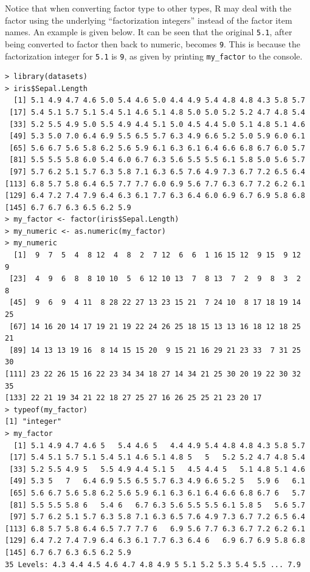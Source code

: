 Notice that when converting factor type to other types, R may deal with the factor using the underlying ``factorization integers'' instead of the factor item names. An example is given below. It can be seen that the original \verb|5.1|, after being converted to factor then back to numeric, becomes \verb|9|. This is because the factorization integer for \verb|5.1| is \verb|9|, as given by printing \verb|my_factor| to the console.
\begin{lstlisting}
> library(datasets)
> iris$Sepal.Length
  [1] 5.1 4.9 4.7 4.6 5.0 5.4 4.6 5.0 4.4 4.9 5.4 4.8 4.8 4.3 5.8 5.7
 [17] 5.4 5.1 5.7 5.1 5.4 5.1 4.6 5.1 4.8 5.0 5.0 5.2 5.2 4.7 4.8 5.4
 [33] 5.2 5.5 4.9 5.0 5.5 4.9 4.4 5.1 5.0 4.5 4.4 5.0 5.1 4.8 5.1 4.6
 [49] 5.3 5.0 7.0 6.4 6.9 5.5 6.5 5.7 6.3 4.9 6.6 5.2 5.0 5.9 6.0 6.1
 [65] 5.6 6.7 5.6 5.8 6.2 5.6 5.9 6.1 6.3 6.1 6.4 6.6 6.8 6.7 6.0 5.7
 [81] 5.5 5.5 5.8 6.0 5.4 6.0 6.7 6.3 5.6 5.5 5.5 6.1 5.8 5.0 5.6 5.7
 [97] 5.7 6.2 5.1 5.7 6.3 5.8 7.1 6.3 6.5 7.6 4.9 7.3 6.7 7.2 6.5 6.4
[113] 6.8 5.7 5.8 6.4 6.5 7.7 7.7 6.0 6.9 5.6 7.7 6.3 6.7 7.2 6.2 6.1
[129] 6.4 7.2 7.4 7.9 6.4 6.3 6.1 7.7 6.3 6.4 6.0 6.9 6.7 6.9 5.8 6.8
[145] 6.7 6.7 6.3 6.5 6.2 5.9
> my_factor <- factor(iris$Sepal.Length)
> my_numeric <- as.numeric(my_factor)
> my_numeric
  [1]  9  7  5  4  8 12  4  8  2  7 12  6  6  1 16 15 12  9 15  9 12  9
 [23]  4  9  6  8  8 10 10  5  6 12 10 13  7  8 13  7  2  9  8  3  2  8
 [45]  9  6  9  4 11  8 28 22 27 13 23 15 21  7 24 10  8 17 18 19 14 25
 [67] 14 16 20 14 17 19 21 19 22 24 26 25 18 15 13 13 16 18 12 18 25 21
 [89] 14 13 13 19 16  8 14 15 15 20  9 15 21 16 29 21 23 33  7 31 25 30
[111] 23 22 26 15 16 22 23 34 34 18 27 14 34 21 25 30 20 19 22 30 32 35
[133] 22 21 19 34 21 22 18 27 25 27 16 26 25 25 21 23 20 17
> typeof(my_factor)
[1] "integer"
> my_factor
  [1] 5.1 4.9 4.7 4.6 5   5.4 4.6 5   4.4 4.9 5.4 4.8 4.8 4.3 5.8 5.7
 [17] 5.4 5.1 5.7 5.1 5.4 5.1 4.6 5.1 4.8 5   5   5.2 5.2 4.7 4.8 5.4
 [33] 5.2 5.5 4.9 5   5.5 4.9 4.4 5.1 5   4.5 4.4 5   5.1 4.8 5.1 4.6
 [49] 5.3 5   7   6.4 6.9 5.5 6.5 5.7 6.3 4.9 6.6 5.2 5   5.9 6   6.1
 [65] 5.6 6.7 5.6 5.8 6.2 5.6 5.9 6.1 6.3 6.1 6.4 6.6 6.8 6.7 6   5.7
 [81] 5.5 5.5 5.8 6   5.4 6   6.7 6.3 5.6 5.5 5.5 6.1 5.8 5   5.6 5.7
 [97] 5.7 6.2 5.1 5.7 6.3 5.8 7.1 6.3 6.5 7.6 4.9 7.3 6.7 7.2 6.5 6.4
[113] 6.8 5.7 5.8 6.4 6.5 7.7 7.7 6   6.9 5.6 7.7 6.3 6.7 7.2 6.2 6.1
[129] 6.4 7.2 7.4 7.9 6.4 6.3 6.1 7.7 6.3 6.4 6   6.9 6.7 6.9 5.8 6.8
[145] 6.7 6.7 6.3 6.5 6.2 5.9
35 Levels: 4.3 4.4 4.5 4.6 4.7 4.8 4.9 5 5.1 5.2 5.3 5.4 5.5 ... 7.9
\end{lstlisting}

